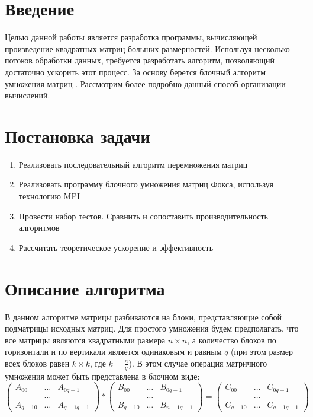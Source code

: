 \documentclass{report}
\begin{document}
\setcounter{page}{2}

\tableofcontents
\newpage

\section*{Введение}
Целью данной работы является разработка программы, вычисляющей произведение квадратных матриц больших размерностей. Используя несколько потоков обработки данных, требуется разработать алгоритм, позволяющий достаточно ускорить этот процесс. За основу берется блочный алгоритм умножения матриц . Рассмотрим более подробно данный способ организации вычислений.

\newpage

\section*{Постановка задачи}
\begin{enumerate} 
    \item Реализовать последовательный алгоритм перемножения матриц
    \item Реализовать программу блочного умножения матриц Фокса, используя технологию MPI
    \item Провести набор тестов. Сравнить и сопоставить производительность алгоритмов
    \item Рассчитать теоретическое ускорение и эффективность
\end{enumerate}
\newpage

\section*{Описание алгоритма}
В данном алгоритме матрицы разбиваются на блоки, представляющие собой подматрицы исходных матриц. Для простого умножения будем предполагать, что все матрицы являются квадратными размера {\itshape $n \times n$}, а количество блоков по горизонтали и по вертикали является одинаковым и равным {\itshape $q$} (при этом размер всех блоков равен {\itshape $k \times k$}, где {\itshape $k = \frac{n}{q} $}). В этом случае операция матричного умножения может быть представлена в блочном виде:
$$
\begin{pmatrix}
A_{00}& \ldots & A_{0q-1}\\
& \ldots\\
A_{q-10}& \ldots & A_{q-1q-1}
\end{pmatrix}
*
\begin{pmatrix}
B_{00}& \ldots & B_{0q-1}\\
& \ldots\\
B_{q-10}& \ldots & B_{n-1q-1}
\end{pmatrix}
=
\begin{pmatrix}
C_{00}& \ldots & C_{0q-1}\\
&\ldots\\
C_{q-10}& \ldots & C_{q-1q-1}
\end{pmatrix}
$$
\end{document}
